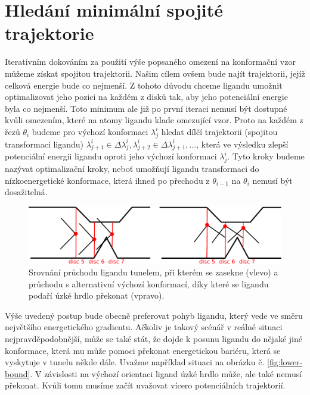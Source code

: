 \section{Hledání minimální spojité trajektorie}
Iterativním dokováním za použití výše popsaného omezení na konformační vzor můžeme
získat spojitou trajektorii. Našim cílem ovšem bude najít trajektorii, jejíž
celková energie bude co nejmenší. Z tohoto důvodu chceme ligandu
umožnit optimalizovat jeho pozici na každém z disků tak, aby jeho potenciální
energie byla co nejmenší. Toto minimum ale již po první iteraci nemusí být dostupné
kvůli omezením, které na atomy ligandu klade omezující vzor. Proto na každém
z řezů $ \theta_i $ budeme pro výchozí konformaci $ \lambda^i_j $ hledat dílčí
trajektorii (spojitou transformaci ligandu) $ \lambda^i_{j+1} \in \Delta \lambda^i_j,
\lambda^i_{j+2} \in \Delta \lambda^i_{j+1}, \dots $, která ve výsledku
zlepší potenciální energii ligandu oproti jeho výchozí konformaci $ \lambda^i_j $.
Tyto kroky budeme nazývat optimalizační kroky, neboť umožňují ligandu transformaci
do nízkoenergetické konformace, která ihned po přechodu z $ \theta_{i - 1} $
na $ \theta_i $ nemusí být dosažitelná.

\begin{figure}[t]
\centering
\includegraphics[width=.8\hsize]{img/tun-3.pdf}
\caption{Srovnání průchodu ligandu tunelem, při kterém se zasekne (vlevo) a
průchodu s alternativní výchozí konformací, díky které se ligandu podaří
úzké hrdlo překonat (vpravo).
}
\label{fig:backtracking}
\end{figure}

Výše uvedený postup bude obecně preferovat pohyb ligandu, který vede ve směru
největšího energetického gradientu. Ačkoliv je takový scénář v reálné situaci
nejpravděpodobnější, může se také stát, že dojde k posunu ligandu do nějaké
jiné konformace, která mu může pomoci překonat energetickou bariéru, která se
vyskytuje v tunelu někde dále. Uvažme například situaci na obrázku
č. \ref{fig:lower-bound}. V závislosti na výchozí orientaci ligand úzké hrdlo
může, ale také nemusí překonat. Kvůli tomu musíme začít uvažovat vícero potenciálních
trajektorií.

